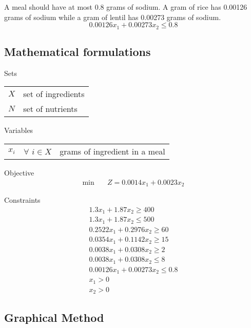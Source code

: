 \documentclass[
]{article}
\begin{document}
\begin{enumerate}
	      A meal should have at most 0.8 grams of sodium. A gram of rice has 0.00126 grams of sodium while a gram of lentil has 0.00273 grams of sodium.
	      \begin{equation}
	      	0.00126x_1 + 0.00273x_2 \le 0.8
	      \end{equation}
\end{enumerate}

\hypertarget{mathematical-formulation}{%
	\subsection{Mathematical formulations}\label{mathematical-formulation}}

Sets\\
\begin{tabular}{ll}
	$X$ & set of ingredients \\
	$N$ & set of nutrients   \\
\end{tabular}

Variables\\
\begin{tabular}{lll}
	$x_{i}$ & $\forall$ $i\in X$ & grams of ingredient in a meal 
\end{tabular}
\setcounter{equation}{0}

Objective
\begin{align}
	\min \quad
	  & Z = 0.0014x_1 + 0.0023x_2 
\end{align}

Constraints
\begin{align}
	1.3x_1 + 1.87x_2 \ge 400        \\
	1.3x_1 + 1.87x_2 \le 500        \\
	0.2522x_1 + 0.2976x_2 \ge 60    \\
	0.0354x_1 + 0.1142x_2 \ge 15    \\
	0.0038x_1 + 0.0308x_2 \ge 2     \\
	0.0038x_1 + 0.0308x_2 \le 8     \\
	0.00126x_1 + 0.00273x_2 \le 0.8 \\
	x_1 > 0                         \\
	x_2 > 0                         
\end{align}
\setcounter{equation}{0}

\hypertarget{graphical-method}{%
	\subsection{Graphical Method}\label{graphical-method}}
\end{document}
